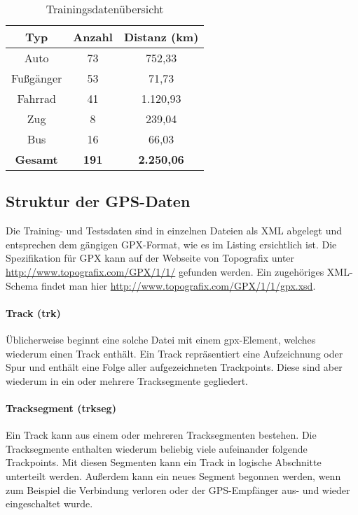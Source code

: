 \begin{table}
\centering
\begin{tabular}{| c | c | c | }
\hline
\textbf{Typ} & \textbf{Anzahl} & \textbf{Distanz (km)}\\ 
\hline
Auto & 73 & 752,33\\
\hline
Fußgänger &	53 & 71,73\\
\hline
Fahrrad	& 41 & 1.120,93\\
\hline
Zug & 8 & 239,04\\
\hline
Bus	& 16 & 66,03\\
\hline
\textbf{Gesamt} & \textbf{191} & \textbf{2.250,06}\\
\hline
\end{tabular}
\caption{Trainingsdatenübersicht}
\label{datenuebsicht}
\end{table}

\subsection{Struktur der GPS-Daten}
Die Training- und Testsdaten sind in einzelnen Dateien als XML abgelegt und entsprechen dem gängigen GPX-Format, wie es im Listing  ersichtlich ist. Die Spezifikation für GPX kann auf der Webseite von Topografix unter \url{ http://www.topografix.com/GPX/1/1/} gefunden werden. Ein zugehöriges XML-Schema findet man hier \url{http://www.topografix.com/GPX/1/1/gpx.xsd}. \cite{topografix_gpx_2004} 

\paragraph{Track (trk)}
Üblicherweise beginnt eine solche Datei mit einem gpx-Element, welches wiederum einen Track enthält. Ein Track repräsentiert eine Aufzeichnung oder Spur und enthält eine Folge aller aufgezeichneten Trackpoints. Diese sind aber wiederum in ein oder mehrere Tracksegmente gegliedert. \cite{topografix_gpx_2004}

\paragraph{Tracksegment (trkseg)}
Ein Track kann aus einem oder mehreren Tracksegmenten bestehen. Die Tracksegmente enthalten wiederum beliebig viele aufeinander folgende Trackpoints. Mit diesen Segmenten kann ein Track in logische Abschnitte unterteilt werden. Außerdem kann ein neues Segment begonnen werden, wenn zum Beispiel die Verbindung verloren oder der GPS-Empfänger aus- und wieder eingeschaltet wurde. \cite{topografix_gpx_2004}

